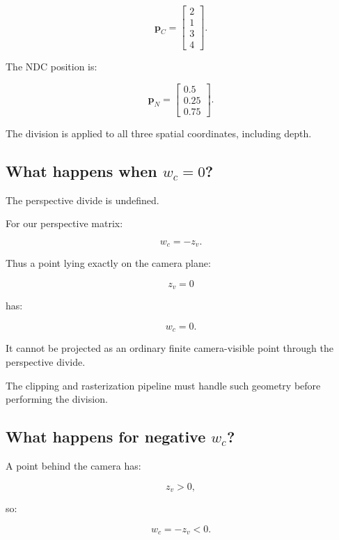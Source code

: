 \[
 \mathbf p_C= \begin{bmatrix} 2\\1\\3\\4 \end{bmatrix}.
\]

The NDC position is:

\[
 \boxed{ \mathbf p_N= \begin{bmatrix} 0.5\\0.25\\0.75 \end{bmatrix} }.
\]

The division is applied to all three spatial coordinates, including depth.

\subsection{\texorpdfstring{What happens when \(w_c=0\)?}{What happens when w\_c=0?}}\label{02-foundations-ii-ch033-what-happens-when-w_c0}

\hypertarget{02-foundations-ii-ch033-what-happens-when-w_c0}{}

The perspective divide is undefined.

For our perspective matrix:

\[
 w_c=-z_v.
\]

Thus a point lying exactly on the camera plane:

\[
 z_v=0
\]

has:

\[
 w_c=0.
\]

It cannot be projected as an ordinary finite camera-visible point through the perspective divide.

The clipping and rasterization pipeline must handle such geometry before performing the division.

\subsection{\texorpdfstring{What happens for negative \(w_c\)?}{What happens for negative w\_c?}}\label{02-foundations-ii-ch033-what-happens-for-negative-w_c}

\hypertarget{02-foundations-ii-ch033-what-happens-for-negative-w_c}{}

A point behind the camera has:

\[
 z_v>0,
\]

so:

\[
 w_c=-z_v<0.
\]

